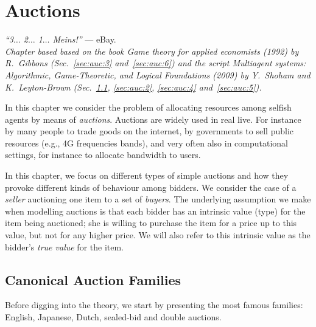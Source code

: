 \ifx \globalmark \undefined %
	
\else 	
\fi




\chapter{Auctions}
{\large{\itshape
``3$\dotsc$ 2$\dotsc$ 1$\dotsc$ Meins!''} --- eBay.\\
}
  {\small{\itshape
Chapter based based
on the book \emph{Game theory for applied economists} (1992) by R.\ Gibbons (Sec.~\ref{sec:auc:3} and~\ref{sec:auc:6}) and the script \emph{Multiagent systems: Algorithmic, Game-Theoretic, and Logical Foundations} (2009) by Y.\ Shoham and K.\ Leyton-Brown (Sec.~\ref{sec:auc:1}, \ref{sec:auc:2}, \ref{sec:auc:4} and~\ref{sec:auc:5}).}\\
}
\label{chap:Auct}


In this chapter we consider the problem of allocating resources among selfish agents by means of \emph{auctions}. Auctions are widely used in real live. For instance by many people to trade goods on the internet, by governments to sell public resources (e.g., 4G frequencies bands), and very often also in computational settings, for instance to allocate bandwidth to users.

In this chapter, we focus on different types of simple auctions and how they provoke different kinds of behaviour among bidders. We consider the case of a \emph{seller} auctioning one item to a set of \emph{buyers}.
The underlying assumption we make when modelling auctions is that each bidder has an intrinsic value (type) for the item being auctioned; she is willing to purchase the item for a price up to this value, but not for any higher price. We will also refer to this intrinsic value as the bidder's \emph{true value} for the item.



\section{Canonical Auction Families}
\label{sec:auc:1}
Before digging into the theory, we start by presenting the most famous families: English, Japanese, Dutch, sealed-bid and double auctions.

